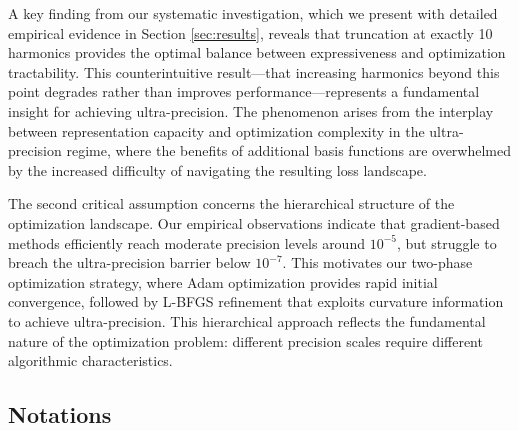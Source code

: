 A key finding from our systematic investigation, which we present with detailed empirical evidence in Section \ref{sec:results}, reveals that truncation at exactly 10 harmonics provides the optimal balance between expressiveness and optimization tractability. This counterintuitive result—that increasing harmonics beyond this point degrades rather than improves performance—represents a fundamental insight for achieving ultra-precision. The phenomenon arises from the interplay between representation capacity and optimization complexity in the ultra-precision regime, where the benefits of additional basis functions are overwhelmed by the increased difficulty of navigating the resulting loss landscape.

The second critical assumption concerns the hierarchical structure of the optimization landscape. Our empirical observations indicate that gradient-based methods efficiently reach moderate precision levels around $10^{-5}$, but struggle to breach the ultra-precision barrier below $10^{-7}$. This motivates our two-phase optimization strategy, where Adam optimization provides rapid initial convergence, followed by L-BFGS refinement that exploits curvature information to achieve ultra-precision. This hierarchical approach reflects the fundamental nature of the optimization problem: different precision scales require different algorithmic characteristics.

\subsection{Notations}


